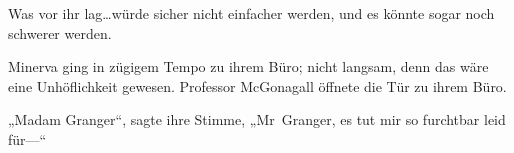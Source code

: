 Was vor ihr lag…würde sicher nicht einfacher werden, und es könnte sogar noch schwerer werden.

\later


Minerva ging in zügigem Tempo zu ihrem Büro; nicht langsam, denn das wäre eine Unhöflichkeit gewesen. Professor McGonagall öffnete die Tür zu ihrem Büro.

„Madam Granger“, sagte ihre Stimme,
„Mr~Granger, es tut mir so furchtbar leid für—“

